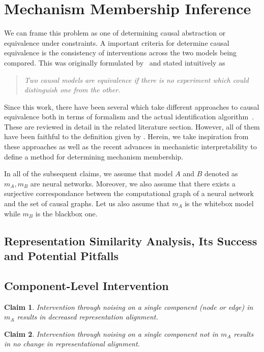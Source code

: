 \documentclass{article}
\newtheorem{claim}{Claim}
\begin{document}
\section{Mechanism Membership Inference}
We can frame this problem as one of determining causal abstraction or equivalence
under constraints. A important criteria for determine causal equivalence is the
consistency of interventions across the two models being compared. 
This was originally formulated by~\cite{verma_equivalence_2022} and stated
intuitively as 
\begin{quote}
\textit{Two causal models are equivalence if there is no experiment which could
distinguish one from the other.}
\end{quote}
Since this work, there have been several which take different approaches to 
causal equivalence both in terms of formalism and the actual identification
algorithm~\citep{beckers_abstracting_2019,otsuka_equivalence_2022,
zennaro_abstraction_2022,massidda_causal_2023}. These are reviewed in detail
in the related literature section. However, all of them have been faithful to
the definition given by \cite{verma_equivalence_2022}. Herein, we take inspiration
from these approaches as well as the recent advances in mechanistic interpretability
to define a method for determining mechanism membership. 

In all of the subsequent claims, we assume that model $A$ and $B$ denoted
as $m_A, m_B$ are neural networks. Moreover, we also assume that there exists
a surjective correspondance between the computational graph of a neural network
and the set of causal graphs. Let us also assume that $m_A$ is the whitebox model
while $m_B$ is the blackbox one. 


\subsection{Representation Similarity Analysis, Its Success and Potential Pitfalls}

\subsection{Component-Level Intervention}
\begin{claim}
Intervention through noising on a single component (node or edge) in $m_A$ results
in decreased representation alignment. 
\end{claim}
\begin{claim}
Intervention through noising on a single component not in $m_A$ results in no
change in representational alignment.
\end{claim}
\end{document}
